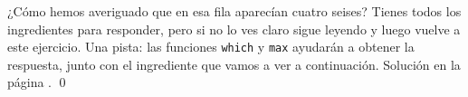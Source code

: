 \documentclass[10pt,a4paper]{article}\usepackage[]{graphicx}\usepackage[]{color}
\newcounter {cont01}
\begin{document}
                                                                                                                                                                 \begin{ejercicio}
                                                                                                                                                            \label{tut03:ejercicio10}
                                                                                                                                                            \quad
                                                                                                                                                            ¿Cómo hemos averiguado que en esa fila aparecían cuatro seises? Tienes todos los ingredientes para responder, pero si no lo ves claro sigue leyendo y luego vuelve a este ejercicio. Una pista: las funciones {\tt which} y {\tt max} ayudarán a obtener la respuesta, junto con el ingrediente que vamos a ver a continuación. Solución en la página \pageref{tut03:ejercicio10:sol}.
                                                                                                                                                            \qed
                                                                                                                                                            \end{ejercicio}
                                                                                                                                                            
\end{document}
